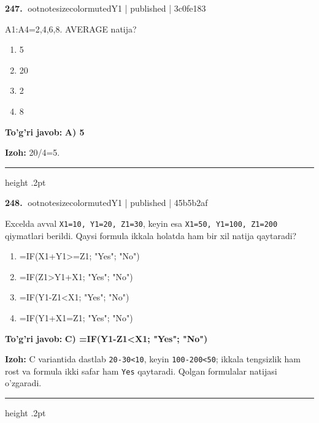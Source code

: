 \documentclass[10pt,a4paper]{article}
\begin{document}
\textbf{\color{ink}247.} {ootnotesizecolor{muted}Y1 | published | 3c0fe183}
\par
A1:A4=2,4,6,8. AVERAGE natija?
\begin{enumerate}[label=\Alph*),leftmargin=9mm]
\item 5
\item 20
\item 2
\item 8
\end{enumerate}
\begin{tcolorbox}[enhanced,breakable,colback=teal!4,colframe=teal!55!black,boxrule=0.45pt,arc=1.2mm,left=2.8mm,right=2.8mm,top=2mm,bottom=2mm]
\textbf{\color{teal}To'g'ri javob:} \textbf{A) 5}
\par\smallskip
\textbf{Izoh:} 20/4=5.
\end{tcolorbox}
\vspace{2mm}\hrule height .2pt\vspace{2mm}

\textbf{\color{ink}248.} {ootnotesizecolor{muted}Y1 | published | 45b5b2af}
\par
Excelda avval \texttt{X1=10, Y1=20, Z1=30}, keyin esa \texttt{X1=50, Y1=100, Z1=200} qiymatlari berildi. Qaysi formula ikkala holatda ham bir xil natija qaytaradi?
\begin{enumerate}[label=\Alph*),leftmargin=9mm]
\item =IF(X1+Y1\textgreater{}=Z1; "Yes"; "No")
\item =IF(Z1\textgreater{}Y1+X1; "Yes"; "No")
\item =IF(Y1-Z1\textless{}X1; "Yes"; "No")
\item =IF(Y1+X1=Z1; "Yes"; "No")
\end{enumerate}
\begin{tcolorbox}[enhanced,breakable,colback=teal!4,colframe=teal!55!black,boxrule=0.45pt,arc=1.2mm,left=2.8mm,right=2.8mm,top=2mm,bottom=2mm]
\textbf{\color{teal}To'g'ri javob:} \textbf{C) =IF(Y1-Z1\textless{}X1; "Yes"; "No")}
\par\smallskip
\textbf{Izoh:} C variantida dastlab \texttt{20-30\textless{}10}, keyin \texttt{100-200\textless{}50}; ikkala tengsizlik ham rost va formula ikki safar ham \texttt{Yes} qaytaradi. Qolgan formulalar natijasi o'zgaradi.
\end{tcolorbox}
\vspace{2mm}\hrule height .2pt\vspace{2mm}
\end{document}
